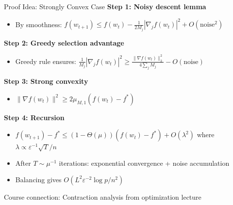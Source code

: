 \documentclass{beamer}
\begin{document}
\begin{frame}{Proof Idea: Strongly Convex Case}
\textbf{Step 1: Noisy descent lemma}
\begin{itemize}
\item By smoothness: $f(w_{t+1}) \leq f(w_t) - \frac{1}{2M_j}|\nabla_j f(w_t)|^2 + O(\text{noise}^2)$
\end{itemize}

\vspace{0.5em}

\textbf{Step 2: Greedy selection advantage}
\begin{itemize}
\item Greedy rule ensures: $\frac{1}{M_j}|\nabla_j f(w_t)|^2 \geq \frac{\|\nabla f(w_t)\|_2^2}{4\sum_j M_j} - O(\text{noise})$
\end{itemize}

\vspace{0.5em}

\textbf{Step 3: Strong convexity}
\begin{itemize}
\item $\|\nabla f(w_t)\|^2 \geq 2\mu_{M,1}(f(w_t) - f^*)$
\end{itemize}

\vspace{0.5em}

\textbf{Step 4: Recursion}
\begin{itemize}
\item $f(w_{t+1}) - f^* \leq (1 - \Theta(\mu))(f(w_t) - f^*) + O(\lambda^2)$ where $\lambda \propto \varepsilon^{-1}\sqrt{T}/n$
\item After $T \sim \mu^{-1}$ iterations: exponential convergence + noise accumulation
\item Balancing gives $O(L^2 \varepsilon^{-2} \log p / n^2)$
\end{itemize}

\vspace{0.3em}

\alert{Course connection:} Contraction analysis from optimization lecture
\end{frame}
\end{document}
